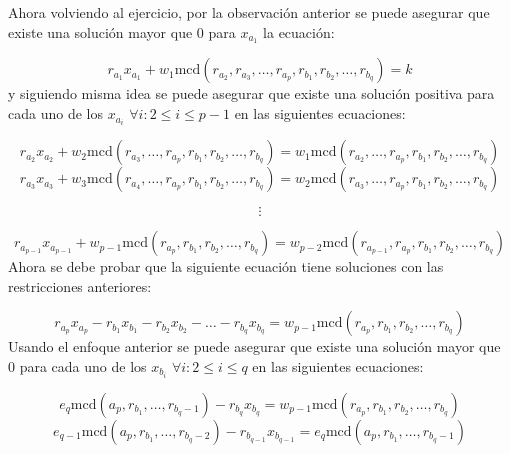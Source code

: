\documentclass{article}
\begin{document}
Ahora volviendo al ejercicio, por la observación anterior se puede asegurar que existe una solución mayor que 0 para $x_{a_1}$ la ecuación:

\begin{equation}
    r_{a_1}x_{a_1}+w_1\text{mcd}(r_{a_2},r_{a_3},\ldots,r_{a_p},r_{b_1},r_{b_2},\ldots,r_{b_q})=k
\end{equation}
y siguiendo misma idea se puede asegurar que existe una solución positiva para cada uno de los $x_{a_i}$ $\forall i: 2\leq i\leq p-1$  en las siguientes ecuaciones:

\begin{equation}
    r_{a_2}x_{a_2}+w_2\text{mcd}(r_{a_3},\ldots,r_{a_p},r_{b_1},r_{b_2},\ldots,r_{b_q}) =w_1\text{mcd}(r_{a_2},\ldots,r_{a_p},r_{b_1},r_{b_2},\ldots,r_{b_q})
\end{equation}
\begin{equation}
    r_{a_3}x_{a_3}+w_3\text{mcd}(r_{a_4},\ldots,r_{a_p},r_{b_1},r_{b_2},\ldots,r_{b_q}) =w_2\text{mcd}(r_{a_3},\ldots,r_{a_p},r_{b_1},r_{b_2},\ldots,r_{b_q})
\end{equation}

$$\vdots $$

\begin{equation}
    r_{a_{p-1}}x_{a_{p-1}}+w_{p-1}\text{mcd}(r_{a_p},r_{b_1},r_{b_2},\ldots,r_{b_q}) =w_{p-2}\text{mcd}(r_{a_{p-1}},r_{a_p},r_{b_1},r_{b_2},\ldots,r_{b_q})
\end{equation}
Ahora se debe probar que la siguiente ecuación tiene soluciones con las restricciones anteriores:

\begin{equation}
    r_{a_p}x_{a_p}-r_{b_1}x_{b_1}-r_{b_2}x_{b_2}-\ldots -r_{b_q}x_{b_q}= w_{p-1}\text{mcd}(r_{a_p},r_{b_1},r_{b_2},\ldots,r_{b_q})
\end{equation}
Usando el enfoque anterior se puede asegurar que existe una solución mayor que 0 para cada uno de los $x_{b_i}$ $\forall i: 2\leq i\leq q$  en las siguientes ecuaciones:

\begin{equation}
    e_{q}\text{mcd}(a_p, r_{b_1},\ldots,r_{b_q-1})-r_{b_q}x_{b_q} =w_{p-1}\text{mcd}(r_{a_p},r_{b_1},r_{b_2},\ldots,r_{b_q})
\end{equation}
\begin{equation}
    e_{q-1}\text{mcd}(a_p, r_{b_1},\ldots,r_{b_q-2})-r_{b_{q-1}}x_{b_{q-1}} =e_{q}\text{mcd}(a_p, r_{b_1},\ldots,r_{b_q-1})
\end{equation}
\end{document}
